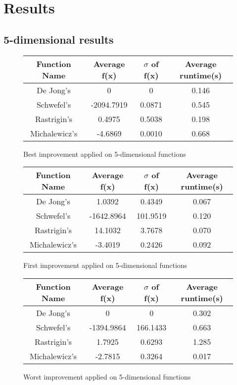 \documentclass{article}
\begin{document}
\section{Results}
\subsection{5-dimensional results}

\begin{figure}[H]
\begin{tabular}{|c||c|c|c|} \hline
	Function Name & Average f(x) & $\sigma$ of f(x) & Average runtime(s) \\ \hline \hline
	De Jong's & 0 & 0 & 0.146 \\ \hline
	Schwefel's & -2094.7919 & 0.0871 & 0.545 \\ \hline
	Rastrigin's & 0.4975 & 0.5038 & 0.198 \\ \hline
	Michalewicz's & -4.6869 & 0.0010 & 0.668 \\ \hline
\end{tabular}
\caption{Best improvement applied on 5-dimensional functions}
\end{figure}

\begin{figure}[H]
\begin{tabular}{|c||c|c|c|} \hline
	Function Name & Average f(x) & $\sigma$ of f(x) & Average runtime(s) \\ \hline \hline
	De Jong's & 1.0392 & 0.4349 & 0.067 \\ \hline
	Schwefel's & -1642.8964 & 101.9519 & 0.120 \\ \hline
	Rastrigin's & 14.1032 & 3.7678 & 0.070 \\ \hline
	Michalewicz's & -3.4019 & 0.2426 & 0.092 \\ \hline
\end{tabular}
\caption{First improvement applied on 5-dimensional functions}
\end{figure}

\begin{figure}[H]
\begin{tabular}{|c||c|c|c|} \hline
	Function Name & Average f(x) & $\sigma$ of f(x) & Average runtime(s) \\ \hline \hline
	De Jong's & 0 & 0 & 0.302 \\ \hline
	Schwefel's & -1394.9864 & 166.1433 & 0.663 \\ \hline
	Rastrigin's & 1.7925 & 0.6293 & 1.285 \\ \hline
	Michalewicz's & -2.7815 & 0.3264 & 0.017 \\ \hline
\end{tabular}
\caption{Worst improvement applied on 5-dimensional functions}
\end{figure}
\end{document}
